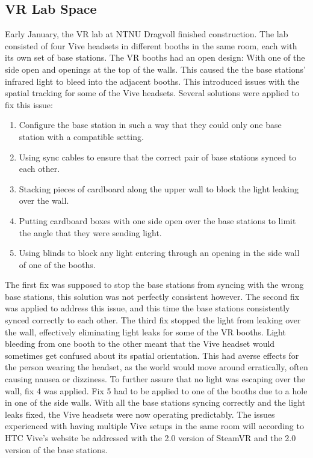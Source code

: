         \subsection{VR Lab Space}
        
        Early January, the VR lab at NTNU Dragvoll finished construction. The lab consisted of four Vive headsets in different booths in the same room, each with its own set of base stations. The VR booths had an open design: With one of the side open and openings at the top of the walls. This caused the the base stations' infrared light to bleed into the adjacent booths. This introduced issues with the spatial tracking for some of the Vive headsets. Several solutions were applied to fix this issue: 
        \begin{enumerate}
            \item Configure the base station in such a way that they could only one base station with a compatible setting.
            \item Using sync cables to ensure that the correct pair of base stations synced to each other.
            \item Stacking pieces of cardboard along the upper wall to block the light leaking over the wall.
            \item Putting cardboard boxes with one side open over the base stations to limit the angle that they were sending light.
            \item Using blinds to block any light entering through an opening in the side wall of one of the booths.
        \end{enumerate}
        
        The first fix was supposed to stop the base stations from syncing with the wrong base stations, this solution was not perfectly consistent however. The second fix was applied to address this issue, and this time the base stations consistently synced correctly to each other. The third fix stopped the light from leaking over the wall, effectively eliminating light leaks for some of the VR booths. Light bleeding from one booth to the other meant that the Vive headset would sometimes get confused about its spatial orientation. This had averse effects for the person wearing the headset, as the world would move around erratically, often causing nausea or dizziness. To further assure that no light was escaping over the wall, fix 4 was applied. Fix 5 had to be applied to one of the booths due to a hole in one of the side walls. With all the base stations syncing correctly and the light leaks fixed, the Vive headsets were now operating predictably. The issues experienced with having multiple Vive setups in the same room will according to HTC Vive's website be addressed with the 2.0 version of SteamVR and the 2.0 version of the base stations. %
 
